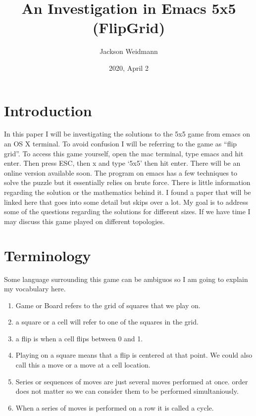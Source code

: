 \documentclass{article}
\title{An Investigation in Emacs 5x5 (FlipGrid)}
\date{2020, April 2}
\author{Jackson Weidmann}
\begin{document}
  \maketitle

  \tableofcontents

  \section{Introduction}
  In this paper I will be investigating the solutions to the 5x5 game from emacs on an OS X terminal. To avoid confusion I will be referring to the game as ``flip grid''. To access this game yourself, open the mac terminal, type emacs and hit enter. Then press ESC, then x and type `5x5' then hit enter. There will be an online version available soon. The program on emacs has a few techniques to solve the puzzle but it essentially relies on brute force. There is little information regarding the solution or the mathematics behind it. I found a paper that will be linked here that goes into some detail but skips over a lot. My goal is to address some of the questions regarding the solutions for different sizes. If we have time I may discuss this game played on different topologies.\par

  \section{Terminology}
  Some language surrounding this game can be ambiguos so I am going to explain my vocabulary here.
  \begin{enumerate}
    \item Game or Board refers to the grid of squares that we play on.
    \item a square or a cell will refer to one of the squares in the grid.
    \item a flip is when a cell flips between 0 and 1.
    \item Playing on a square means that a flip is centered at that point. We could also call this a move or a move at a cell location.
    \item Series or sequences of moves are just several moves performed at once. order does not matter so we can consider them to be performed simultaniously.
    \item When a series of moves is performed on a row it is called a cycle.
  \end{enumerate}
\end{document}
